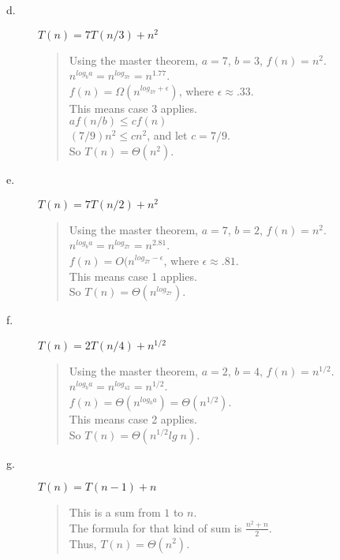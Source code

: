 \documentclass{article}
\begin{document}
\begin{description}
\item[d.]$T(n) = 7T(n/3) + n^2$
\begin{quote}
\textsf{Using the master theorem, $a = 7$, $b = 3$, $f(n) = n^2$.\\
$n^{log_ba} = n^{log_37} = n^{1.77}$.\\
$f(n) = \Omega(n^{log_37 + \epsilon})$, where $\epsilon \approx .33$.\\
This means case 3 applies.\\
$af(n/b) \leq cf(n)$\\
$(7/9)n^2 \leq cn^2$, and let $c = 7/9$.\\
So $T(n) = \Theta(n^2)$.}
\end{quote}

\item[e.]$T(n) = 7T(n/2) + n^2$
\begin{quote}
\textsf{Using the master theorem, $a = 7$, $b = 2$, $f(n) = n^2$.\\
$n^{log_ba} = n^{log_27} = n^{2.81}$.\\
$f(n) = O(n^{log_27 - \epsilon}$, where $\epsilon \approx .81$.\\
This means case 1 applies.\\
So $T(n) = \Theta(n^{log_27})$.}
\end{quote}

\item[f.]$T(n) = 2T(n/4) + n^{1/2}$
\begin{quote}
\textsf{Using the master theorem, $a = 2$, $b = 4$, $f(n) = n^{1/2}$.\\
$n^{log_ba} = n^{log_42} = n^{1/2}$.\\
$f(n) = \Theta(n^{log_ba}) = \Theta(n^{1/2})$.\\
This means case 2 applies.\\
So $T(n) = \Theta(n^{1/2}lg\; n)$.}
\end{quote}

\item[g.]$T(n) = T(n-1) + n$
\begin{quote}
\textsf{This is a sum from $1$ to $n$.\\
The formula for that kind of sum is $\frac{n^2+n}{2}$.\\
Thus, $T(n) = \Theta(n^2)$.}
\end{quote}


\end{description}
\end{document}
